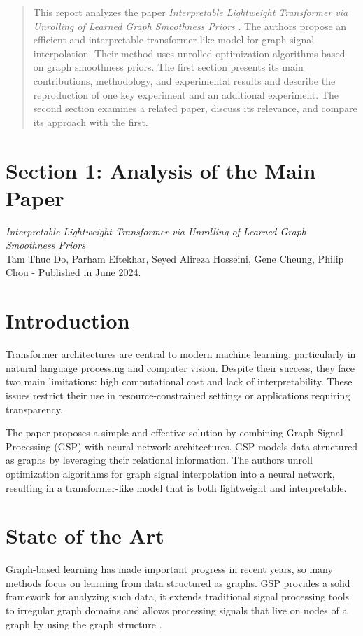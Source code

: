 \documentclass{article}
\theoremstyle{plain}
\theoremstyle{definition}
\theoremstyle{remark}
\begin{document}
\begin{abstract}
This report analyzes the paper \textit{Interpretable Lightweight Transformer via Unrolling of Learned Graph Smoothness Priors} \cite{do2024interpretable}. The authors propose an efficient and interpretable transformer-like model for graph signal interpolation. Their method uses unrolled optimization algorithms based on graph smoothness priors. The first section presents its main contributions, methodology, and experimental results and describe the reproduction of one key experiment and an additional experiment. The second section examines a related paper, discuss its relevance, and compare its approach with the first.
\end{abstract}

\section*{Section 1: Analysis of the Main Paper}

\textit{Interpretable Lightweight Transformer via Unrolling of Learned Graph Smoothness Priors}
\\Tam Thuc Do, Parham Eftekhar, Seyed Alireza Hosseini, Gene Cheung, Philip Chou - Published in June 2024.

\section{Introduction}

Transformer architectures are central to modern machine learning, particularly in natural language processing and computer vision. Despite their success, they face two main limitations: high computational cost and lack of interpretability. These issues restrict their use in resource-constrained settings or applications requiring transparency.

The paper proposes a simple and effective solution by combining Graph Signal Processing (GSP) with neural network architectures. GSP models data structured as graphs by leveraging their relational information. The authors unroll optimization algorithms for graph signal interpolation into a neural network, resulting in a transformer-like model that is both lightweight and interpretable.

\section{State of the Art}

Graph-based learning has made important progress in recent years, so many methods focus on learning from data structured as graphs. GSP provides a solid framework for analyzing such data, it extends traditional signal processing tools to irregular graph domains and allows processing signals that live on nodes of a graph by using the graph structure \cite{shuman2013emerging}.
\end{document}
